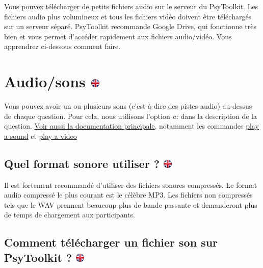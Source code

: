 \documentclass[
]{book}
\begin{document}
Vous pouvez télécharger de petits fichiers audio sur le serveur du PsyToolkit. Les fichiers audio plus volumineux et tous les fichiers vidéo doivent être téléchargés sur un serveur séparé. PsyToolkit recommande Google Drive, qui fonctionne très bien et vous permet d'accéder rapidement aux fichiers audio/vidéo. Vous apprendrez ci-dessous comment faire.

\hypertarget{audiosons}{%
\section[Audio/sons ]{\texorpdfstring{Audio/sons \href{https://www.psytoolkit.org/lessons/surveyaudiovideo.html\#_audio_sound}{\protect\includegraphics{img/ukflag.png}}}{Audio/sons }}\label{audiosons}}

Vous pouvez avoir un ou plusieurs sons (c'est-à-dire des pistes audio) au-dessus de chaque question. Pour cela, nous utilisons l'option \emph{a:} dans la description de la question. \protect\hyperlink{s8}{Voir aussi la documentation principale}, notamment les commandes \protect\hyperlink{playasound}{play a sound} et \protect\hyperlink{playavideo}{play a video}

\hypertarget{quel-format-sonore-utiliser}{%
\subsection[Quel format sonore utiliser ? ]{\texorpdfstring{Quel format sonore utiliser ? \href{https://www.psytoolkit.org/lessons/surveyaudiovideo.html\#_what_sound_format_to_use}{\protect\includegraphics{img/ukflag.png}}}{Quel format sonore utiliser ? }}\label{quel-format-sonore-utiliser}}

Il est fortement recommandé d'utiliser des fichiers sonores compressés. Le format audio compressé le plus courant est le célèbre MP3. Les fichiers non compressés tels que le WAV prennent beaucoup plus de bande passante et demanderont plus de temps de chargement aux participants.

\hypertarget{comment-tuxe9luxe9charger-un-fichier-son-sur-psytoolkit}{%
\subsection[Comment télécharger un fichier son sur PsyToolkit ? ]{\texorpdfstring{Comment télécharger un fichier son sur PsyToolkit ? \href{https://www.psytoolkit.org/lessons/surveyaudiovideo.html\#_how_to_upload_a_sound_file_to_psytoolkit}{\protect\includegraphics{img/ukflag.png}}}{Comment télécharger un fichier son sur PsyToolkit ? }}\label{comment-tuxe9luxe9charger-un-fichier-son-sur-psytoolkit}}
\end{document}
